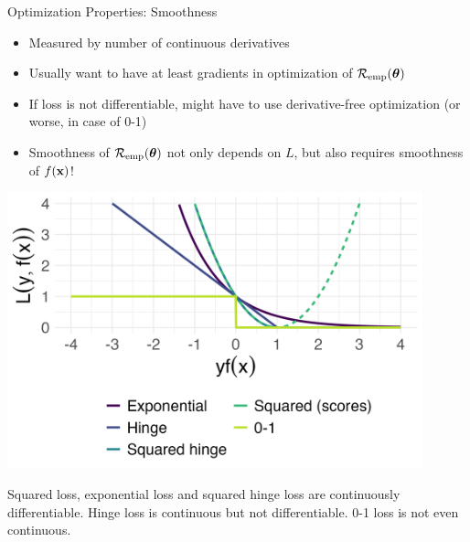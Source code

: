 \documentclass[11pt,compress,t,notes=noshow, xcolor=table]{beamer}
\begin{document}

\begin{vbframe}{Optimization Properties: Smoothness}


\begin{itemize}
\item Measured by number of continuous derivatives
\item Usually want to have at least gradients in optimization of $\mathcal{R}_{\text{emp}}(\bm{\theta})$
\item If loss is not differentiable, might have to use derivative-free optimization (or worse, in case of 0-1)
\item Smoothness of $\mathcal{R}_{\text{emp}}(\bm{\theta})$ not only depends on $L$, but also requires smoothness of $f(\mathbf{x})$! 
\end{itemize}

\vfill

\begin{minipage}[c]{0.4\textwidth}
  \includegraphics[width=0.9\textwidth]{figure/overview_classif.png}
\end{minipage}%
\begin{minipage}[c]{0.05\textwidth}
  \phantom{foo}
\end{minipage}%
\begin{minipage}[c]{0.55\textwidth}
  \footnotesize \raggedright
  Squared loss, exponential loss and squared hinge loss are continuously 
  differentiable. Hinge loss is continuous but not differentiable. 
  0-1 loss is not even continuous.
\end{minipage}%


\end{vbframe}
\end{document}
